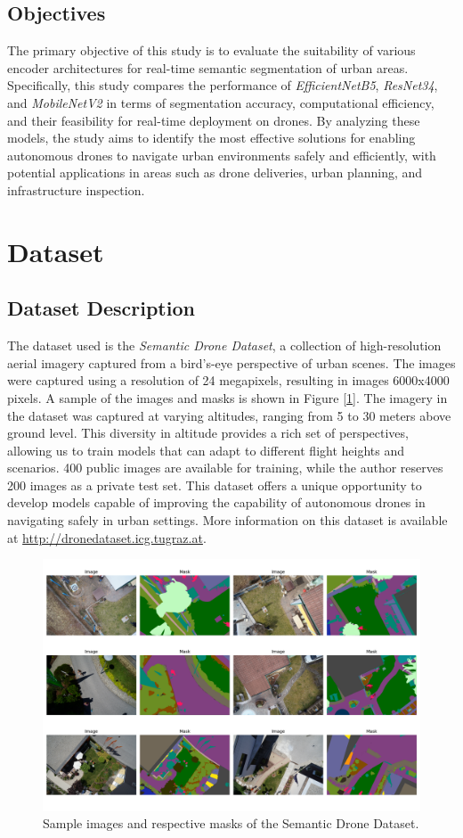 \documentclass[a4paper]{article}
\begin{document}
\subsection{Objectives}
The primary objective of this study is to evaluate the suitability of various encoder architectures for real-time semantic segmentation of urban areas. Specifically, this study compares the performance of \textit{EfficientNetB5}, \textit{ResNet34}, and \textit{MobileNetV2} in terms of segmentation accuracy, computational efficiency, and their feasibility for real-time deployment on drones. By analyzing these models, the study aims to identify the most effective solutions for enabling autonomous drones to navigate urban environments safely and efficiently, with potential applications in areas such as drone deliveries, urban planning, and infrastructure inspection. 

\section{Dataset}
\subsection{Dataset Description}
The dataset used is the \textit{Semantic Drone Dataset}, a collection of high-resolution aerial imagery captured from a bird's-eye perspective of urban scenes. The images were captured using a resolution of 24 megapixels, resulting in images 6000x4000 pixels. A sample of the images and masks is shown in Figure [\ref{fig:collection_1}]. The imagery in the dataset was captured at varying altitudes, ranging from 5 to 30 meters above ground level. This diversity in altitude provides a rich set of perspectives, allowing us to train models that can adapt to different flight heights and scenarios. 400 public images are available for training, while the author reserves 200 images as a private test set. This dataset offers a unique opportunity to develop models capable of improving the capability of autonomous drones in navigating safely in urban settings. More information on this dataset is available at \url{http://dronedataset.icg.tugraz.at}. 

\begin{figure}[!htbp]
    \centering
    \includegraphics[width=0.7\linewidth]{images/collection_1.png}
    \caption{Sample images and respective masks of the Semantic Drone Dataset.}
    \label{fig:collection_1}
    \vspace{5pt}   
\end{figure}
\end{document}
